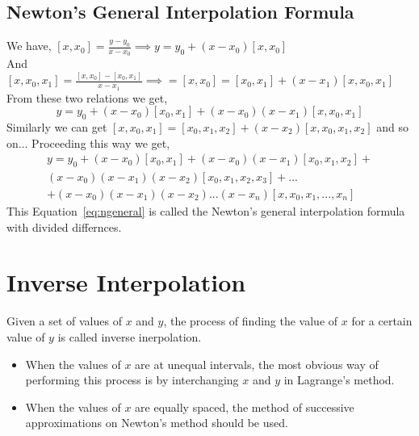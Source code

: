 \documentclass[aima203_lecturenotes_ku.tex]{subfiles}
\begin{document}
\subsection{Newton's General Interpolation Formula}
We have,  $\displaystyle [x,x_0] = \frac{y - y_0}{x - x_0} \implies y = y_0 + (x-x_0)[x,x_0]$ \\[1mm]
And $\displaystyle [x,x_0,x_1] =  \frac{[x, x_0]-[x_0,x_1]}{x - x_1} \implies = [x,x_0] = [x_0,x_1] + (x-x_1)[x,x_0,x_1]$ \\[1mm]
From these two relations we get,
\begin{equation}
  \label{ninter}
  y = y_0 + (x-x_0)[x_0,x_1] + (x-x_0)(x-x_1)[x,x_0,x_1]
\end{equation}
Similarly we can get $[x,x_0,x_1] =  [x_0,x_1,x_2] + (x-x_2)[x,x_0,x_1,x_2]$ and so on...
Proceeding this way we get,
\begin{equation}
  \label{eq:ngeneral}
  \begin{gathered}
    y = y_0 + (x-x_0)[x_0,x_1] + (x-x_0)(x-x_1)[x_0,x_1,x_2] + \\[1mm]
    (x-x_0)(x-x_1)(x-x_2)[x_0,x_1,x_2,x_3] + ... \\[1mm]
    + (x-x_0)(x-x_1)(x-x_2)...(x-x_n)[x,x_0,x_1,...,x_n]
  \end{gathered}
  \end{equation}
  This Equation~\ref{eq:ngeneral} is called the Newton's general interpolation formula with divided differnces.

  \section{Inverse Interpolation}
  Given a set of values of $x$ and $y$, the process of finding the value of $x$ for a certain value of $y$ is called inverse inerpolation.
  \begin{itemize}
  \item When the values of $x$ are at unequal intervals, the most obvious way of performing this process is by interchanging $x$ and $y$ in Lagrange's method.
    \item When the values of $x$ are equally spaced, the method of successive approximations on Newton's method should be used.
  \end{itemize}
\end{document}

